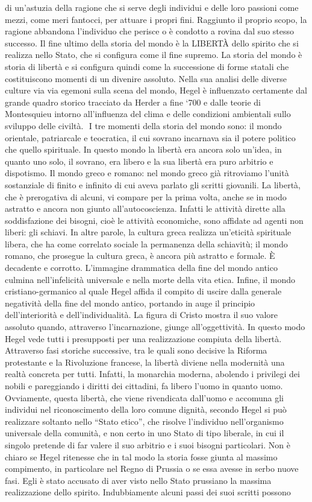 \documentclass[a4paper,12pt,oneside,openany]{book}%
\begin{document}
di un’astuzia della ragione che si serve degli individui e delle loro passioni come mezzi, come meri fantocci, per attuare i propri fini. Raggiunto il proprio scopo, la ragione abbandona l’individuo che perisce o è condotto a rovina dal suo stesso successo. Il fine ultimo della storia del mondo è la LIBERTÀ dello spirito che si realizza nello Stato, che si configura come il fine supremo. La storia del mondo è storia di libertà e si configura quindi come la successione di forme statali che costituiscono momenti di un divenire assoluto. Nella sua analisi delle diverse culture via via egemoni sulla scena del mondo, Hegel è influenzato certamente dal grande quadro storico tracciato da Herder a fine ‘700 e dalle teorie di Montesquieu intorno all’influenza del clima e delle condizioni ambientali sullo sviluppo delle civiltà.  I tre momenti della storia del mondo sono: il mondo orientale, patriarcale e teocratica, il cui sovrano incarnava sia il potere politico che quello spirituale. In questo mondo la libertà era ancora solo un’idea, in quanto uno solo, il sovrano, era libero e la sua libertà era puro arbitrio e dispotismo. Il mondo greco e romano: nel mondo greco già ritroviamo l’unità sostanziale di finito e infinito di cui aveva parlato gli scritti giovanili. La libertà, che è prerogativa di alcuni, vi compare per la prima volta, anche se in modo astratto e ancora non giunto all’autocoscienza. Infatti le attività dirette alla soddisfazione dei bisogni, cioè le attività economiche, sono affidate ad agenti non liberi: gli schiavi. In altre parole, la cultura greca realizza un’eticità spirituale libera, che ha come correlato sociale la permanenza della schiavitù; il mondo romano, che prosegue la cultura greca, è ancora più astratto e formale. È decadente e corrotto. L’immagine drammatica della fine del mondo antico culmina nell’infelicità universale e nella morte della vita etica. Infine, il mondo cristiano-germanico al quale Hegel affida il compito di uscire dalla generale negatività della fine del mondo antico, portando in auge il principio dell’interiorità e dell’individualità. La figura di Cristo mostra il suo valore assoluto quando, attraverso l’incarnazione, giunge all’oggettività. In questo modo Hegel vede tutti i presupposti per una realizzazione compiuta della libertà. Attraverso fasi storiche successive, tra le quali sono decisive la Riforma protestante e la Rivoluzione francese, la libertà diviene nella modernità una realtà concreta per tutti. Infatti, la monarchia moderna, abolendo i privilegi dei nobili e pareggiando i diritti dei cittadini, fa libero l’uomo in quanto uomo. Ovviamente, questa libertà, che viene rivendicata dall’uomo e accomuna gli individui nel riconoscimento della loro comune dignità, secondo Hegel si può realizzare soltanto nello “Stato etico”, che risolve l’individuo nell’organismo universale della comunità, e non certo in uno Stato di tipo liberale, in cui il singolo pretende di far valere il suo arbitrio e i suoi bisogni particolari. Non è chiaro se Hegel ritenesse che in tal modo la storia fosse giunta al massimo compimento, in particolare nel Regno di Prussia o se essa avesse in serbo nuove fasi. Egli è stato accusato di aver visto nello Stato prussiano la massima realizzazione dello spirito. Indubbiamente alcuni passi dei suoi scritti possono 
\end{document}

